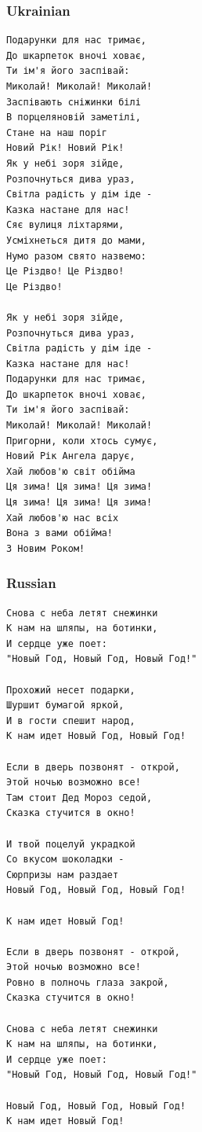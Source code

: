 \documentclass[
]{article}
\begin{document}
\hypertarget{ukrainian-2}{%
\subsubsection*{Ukrainian}\label{ukrainian-2}}

\begin{verbatim}
Подарунки для нас тримає,
До шкарпеток вночі ховає,
Ти ім'я його заспівай:
Миколай! Миколай! Миколай!
Заспівають сніжинки білі
В порцеляновій заметілі,
Стане на наш поріг
Новий Рік! Новий Рік!
Як у небі зоря зійде,
Розпочнуться дива ураз,
Світла радість у дім іде -
Казка настане для нас!
Сяє вулиця ліхтарями,
Усміхнеться дитя до мами,
Нумо разом свято назвемо:
Це Різдво! Це Різдво!
Це Різдво!

Як у небі зоря зійде,
Розпочнуться дива ураз,
Світла радість у дім іде -
Казка настане для нас!
Подарунки для нас тримає,
До шкарпеток вночі ховає,
Ти ім'я його заспівай:
Миколай! Миколай! Миколай!
Пригорни, коли хтось сумує,
Новий Рік Ангела дарує,
Хай любов'ю світ обійма
Ця зима! Ця зима! Ця зима!
Ця зима! Ця зима! Ця зима!
Хай любов'ю нас всіх
Вона з вами обійма!
З Новим Роком!
\end{verbatim}

\hypertarget{russian-1}{%
\subsubsection*{Russian}\label{russian-1}}

\begin{verbatim}
Снова с неба летят снежинки
К нам на шляпы, на ботинки,
И сердце уже поет:
"Новый Год, Новый Год, Новый Год!"

Прохожий несет подарки,
Шуршит бумагой яркой,
И в гости спешит народ,
К нам идет Новый Год, Новый Год!

Если в дверь позвонят - открой,
Этой ночью возможно все!
Там стоит Дед Мороз седой,
Сказка стучится в окно!

И твой поцелуй украдкой
Со вкусом шоколадки - 
Сюрпризы нам раздает
Новый Год, Новый Год, Новый Год!

К нам идет Новый Год!

Если в дверь позвонят - открой,
Этой ночью возможно все!
Ровно в полночь глаза закрой,
Сказка стучится в окно!

Снова с неба летят снежинки
К нам на шляпы, на ботинки,
И сердце уже поет:
"Новый Год, Новый Год, Новый Год!"

Новый Год, Новый Год, Новый Год!
К нам идет Новый Год!
\end{verbatim}
\end{document}
